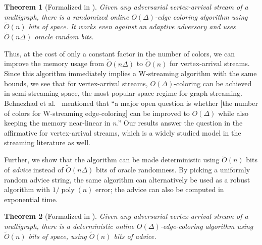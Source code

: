 \documentclass[10pt]{article}
\newtheorem{theorem}{Theorem}[section]
\theoremstyle{definition}\newtheorem{definition}[lemma]{Definition}
\theoremstyle{remark}  \newtheorem*{remark}{Remark}
\newcommand{\tO}{\widetilde{O}}
\DeclareMathOperator{\poly}{poly}
\begin{document}
\begin{theorem}[Formalized in ]\label{thm:online-rand-va-edgecol}
  Given any adversarial vertex-arrival stream of a multigraph, there is a randomized online $O(\Delta)$-edge coloring algorithm using $\tO(n)$ bits of space. It works even against an adaptive adversary and uses $\tO(n \Delta)$ oracle random bits.
\end{theorem}

  

Thus, at the cost of only a constant factor in the number of colors, we can improve the memory usage from $\tO(n\Delta)$ to $\tO(n)$ for vertex-arrival streams. Since this algorithm immediately implies a W-streaming algorithm with the same bounds, we see that for vertex-arrival streams,
$O(\Delta)$-coloring can be achieved in semi-streaming space, the most popular space regime for graph streaming. Behnezhad et al.~\cite{BehnezhadDHKS19} mentioned that ``a major open question is whether [the number of colors for W-streaming edge-coloring] can be improved to $O(\Delta)$ while also
keeping the memory near-linear in $n$.'' Our results answer the question in the affirmative for vertex-arrival streams, which is a widely studied model in the streaming literature as well. 

Further, we show that the algorithm can be made deterministic using $\tO(n)$ bits of \emph{advice} instead of $\tO(n \Delta)$  bits of oracle randomness. By picking a uniformly random advice string, the same algorithm can alternatively be used as a robust algorithm with $1/\poly(n)$ error; the advice can also be computed in exponential time.

\begin{theorem}[Formalized in ]\label{thm:online-det-va-edgecol}
    Given any adversarial vertex-arrival stream of a multigraph, there is a deterministic online $O(\Delta)$-edge-coloring algorithm using $\tO(n)$ bits of space, using $\tO(n)$ bits of advice. 
\end{theorem}
\end{document}
